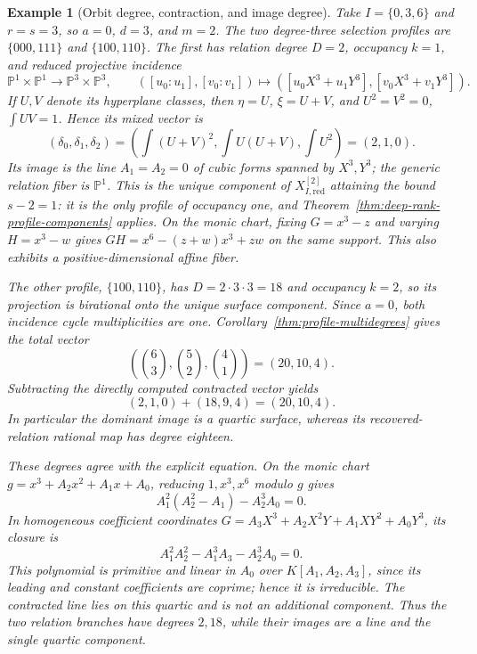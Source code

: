 \documentclass[10pt,fleqn]{article}
\numberwithin{equation}{section}
\newtheorem{example}[theorem]{Example}
\newcommand{\PP}{\mathbb P}
\begin{document}
\begin{example}[Orbit degree, contraction, and image degree]
\label{ex:occupancy-filter}
Take $I=\{0,3,6\}$ and $r=s=3$, so $a=0$, $d=3$, and $m=2$.
The two degree-three selection profiles are $\{000,111\}$ and
$\{100,110\}$.  The first has relation degree $D=2$, occupancy $k=1$,
and reduced projective incidence
\[
 \PP^1\times\PP^1\longrightarrow\PP^3\times\PP^3,
 \qquad
 ([u_0:u_1],[v_0:v_1])\longmapsto
 ([u_0X^3+u_1Y^3],[v_0X^3+v_1Y^3]).
\]
If $U,V$ denote its hyperplane classes, then $\eta=U$,
$\xi=U+V$, and $U^2=V^2=0$, $\int UV=1$.  Hence its mixed vector is
\[
 (\delta_0,\delta_1,\delta_2)
 =\left(\int(U+V)^2,\int U(U+V),\int U^2\right)=(2,1,0).
\]
Its image is the line $A_1=A_2=0$ of cubic forms spanned by $X^3,Y^3$;
the generic relation fiber is $\PP^1$.  This is the unique component of
$X_{I,\mathrm{red}}^{[2]}$ attaining the bound $s-2=1$:
it is the only profile of occupancy one, and
Theorem~\ref{thm:deep-rank-profile-components} applies.  On the monic chart, fixing $G=x^3-z$
and varying $H=x^3-w$ gives
$GH=x^6-(z+w)x^3+zw$ on the same support.  This also exhibits a positive-dimensional affine fiber.

The other profile, $\{100,110\}$, has $D=2\cdot3\cdot3=18$ and
occupancy $k=2$, so its projection is birational onto the unique surface
component.  Since $a=0$, both incidence cycle multiplicities are one.
Corollary~\ref{thm:profile-multidegrees} gives the total vector
\[
 \left(\binom63,\binom52,\binom41\right)=(20,10,4).
\]
Subtracting the directly computed contracted vector yields
\begin{equation}\label{eq:occupancy-example-multidegrees}
 (2,1,0)+(18,9,4)=(20,10,4).
\end{equation}
In particular the dominant image is a quartic surface, whereas its
recovered-relation rational map has degree eighteen.

These degrees agree with the explicit equation.  On the monic chart
$g=x^3+A_2x^2+A_1x+A_0$, reducing $1,x^3,x^6$ modulo $g$ gives
\begin{equation}\label{eq:occupancy-example-equation}
 A_1^2(A_2^2-A_1)-A_2^3A_0=0.
\end{equation}
In homogeneous coefficient coordinates
$G=A_3X^3+A_2X^2Y+A_1XY^2+A_0Y^3$, its closure is
\[
 A_1^2A_2^2-A_1^3A_3-A_2^3A_0=0.
\]
This polynomial is primitive and linear in $A_0$ over
$K[A_1,A_2,A_3]$, since its leading and constant coefficients are
coprime; hence it is irreducible.  The contracted line lies on this
quartic and is not an additional component.  Thus the two relation
branches have degrees $2,18$, while their images are a line and the
single quartic component.
\end{example}
\end{document}
